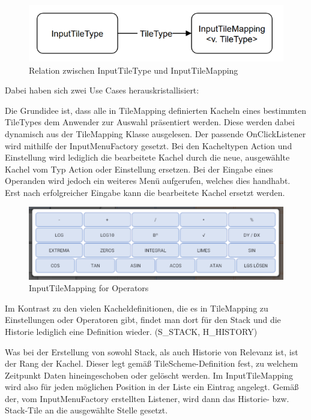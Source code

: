 \begin{figure}[h]
	\includegraphics[scale=1]{img/relation-tiletype-tilemapping}
	\caption[Relation zwischen InputTileType und InputTileMapping]{Relation zwischen InputTileType und InputTileMapping\footnotemark}
\end{figure}

Dabei haben sich zwei Use Cases herauskristallisiert:

Die Grundidee ist, dass alle in TileMapping definierten Kacheln eines bestimmten TileTypes dem Anwender zur Auswahl präsentiert werden. Diese werden dabei dynamisch aus der TileMapping Klasse ausgelesen. Der passende OnClickListener wird mithilfe der InputMenuFactory gesetzt. Bei den Kacheltypen Action und Einstellung wird lediglich die bearbeitete Kachel durch die neue, ausgewählte Kachel vom Typ Action oder Einstellung ersetzen. Bei der Eingabe eines Operanden wird jedoch ein weiteres Menü aufgerufen, welches dies handhabt. Erst nach erfolgreicher Eingabe kann die bearbeitete Kachel ersetzt werden.

\begin{figure}[h]
	\includegraphics[width=\columnwidth]{img/inputtilemapping-for-operators}
	\caption[InputTileMapping for Operators]{InputTileMapping for Operators\footnotemark}
\end{figure}

Im Kontrast zu den vielen Kacheldefinitionen, die es in TileMapping zu Einstellungen oder Operatoren gibt, findet man dort für den Stack und die Historie lediglich eine Definition wieder. (S\_STACK, H\_HISTORY)

Was bei der Erstellung von sowohl Stack, als auch Historie von Relevanz ist, ist der Rang der Kachel. Dieser legt gemäß TileScheme-Definition fest, zu welchem Zeitpunkt Daten hineingeschoben oder gelöscht werden. Im InputTileMapping wird also für jeden möglichen Position in der Liste ein Eintrag angelegt. Gemäß der, vom InputMenuFactory erstellten Listener, wird dann das Historie- bzw. Stack-Tile an die ausgewählte Stelle gesetzt.

